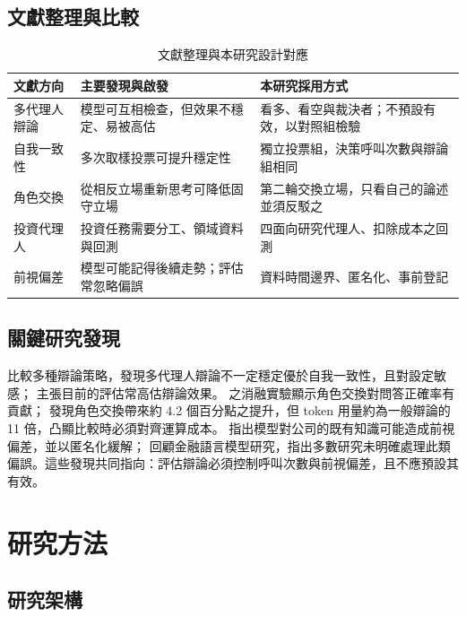 \documentclass[12pt,a4paper]{article}
\begin{document}
\begin{CJK}{UTF8}{bkai}
\subsection{文獻整理與比較}

\begin{table}[H]
\centering\small
\caption{文獻整理與本研究設計對應}
\label{tab:litmap}
\begin{tabularx}{\textwidth}{@{}l Y Y@{}}
\toprule
文獻方向 & 主要發現與啟發 & 本研究採用方式 \\
\midrule
多代理人辯論 & 模型可互相檢查，但效果不穩定、易被高估 & 看多、看空與裁決者；不預設有效，以對照組檢驗 \\
自我一致性 & 多次取樣投票可提升穩定性 & 獨立投票組，決策呼叫次數與辯論組相同 \\
角色交換 & 從相反立場重新思考可降低固守立場 & 第二輪交換立場，只看自己的論述並須反駁之 \\
投資代理人 & 投資任務需要分工、領域資料與回測 & 四面向研究代理人、扣除成本之回測 \\
前視偏差 & 模型可能記得後續走勢；評估常忽略偏誤 & 資料時間邊界、匿名化、事前登記 \\
\bottomrule
\end{tabularx}
\end{table}

\subsection{關鍵研究發現}

\citet{smit2023mad} 比較多種辯論策略，發現多代理人辯論不一定穩定優於自我一致性，且對設定敏感；\citet{zhang2025stop} 主張目前的評估常高估辯論效果。\citet{liu2025roleswitch} 之消融實驗顯示角色交換對問答正確率有貢獻；\citet{chowdhury2026proclaim} 發現角色交換帶來約 4.2 個百分點之提升，但 token 用量約為一般辯論的 11 倍，凸顯比較時必須對齊運算成本。\citet{glasserman2023lookahead} 指出模型對公司的既有知識可能造成前視偏差，並以匿名化緩解；\citet{kong2026bias} 回顧金融語言模型研究，指出多數研究未明確處理此類偏誤。這些發現共同指向：評估辯論必須控制呼叫次數與前視偏差，且不應預設其有效。

\section{研究方法}

\subsection{研究架構}


\end{CJK}
\end{document}
